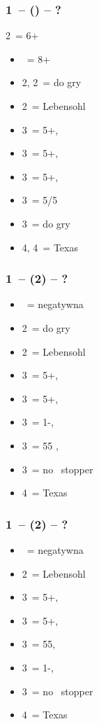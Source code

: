 \documentclass[12pt, a4paper]{report}
\begin{document}
{    \subsubsection*{1\ntx\ -- (\alrts{2\diams}) -- ?}
    2\diams\ = 6+ \major
    \begin{itemize}
        \item \dbl\ = 8+
        \item 2\hearts, 2\spades\ = do gry
        \item 2\nt\ = Lebensohl
        \item 3\clubs\ = 5+\diams, \invp
        \item 3\diams\ = 5+\hearts, \invp
        \item 3\hearts\ = 5+\spades, \invp
        \item 3\spades\ = 5/5 \minor
        \item 3\nt\ = do gry
        \item 4\diams, 4\hearts\ = Texas
    \end{itemize}

    \subsubsection*{1\ntx\ -- (2\hearts) -- ?}
    \begin{itemize}
        \item \dbl\ = negatywna
        \item 2\spades\ = do gry
        \item 2\nt\ = Lebensohl
        \item 3\clubs\ = 5+\diams, \invp
        \item 3\diams\ = 5+\spades, \invp
        \item 3\hearts\ = 1-\hearts, \invp
        \item 3\spades\ = 55 \minor, \gf
        \item 3\nt\ = no \hearts\ stopper
        \item 4\hearts\ = Texas
    \end{itemize}

    \subsubsection*{1\ntx\ -- (2\spades) -- ?}
    \begin{itemize}
        \item \dbl\ = negatywna
        \item 2\nt\ = Lebensohl
        \item 3\clubs\ = 5+\diams, \invp
        \item 3\diams\ = 5+\hearts, \invp
        \item 3\hearts\ = 55\minor, \gf
        \item 3\spades\ = 1-\spades, \invp
        \item 3\nt\ = no \spades\ stopper
        \item 4\diams\ = Texas
    \end{itemize}

}
\end{document}
